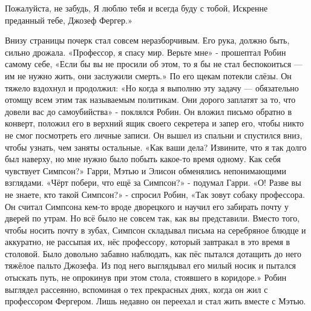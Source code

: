 \documentclass[a4paper,12pt]{book}
\begin{document}
	Пожалуйста, не забудь,
	Я люблю тебя и всегда буду с тобой,
	Искренне преданный тебе,
	Джозеф Фергер.»	
	
	Внизу страницы почерк стал совсем неразборчивым. Его рука, должно быть, сильно дрожала.	
	«Профессор, я спасу мир. Верьте мне» - прошептал Робин самому себе,
	«Если бы вы не просили об этом, то я бы не стал беспокоиться — им не нужно жить, они заслужили смерть.»
	По его щекам потекли слёзы. Он тяжело вздохнул и продолжил:
	«Но когда я выполню эту задачу — обязательно отомщу всем этим так называемым политикам. Они дорого заплатят за то, что довели вас до самоубийства» - поклялся Робин.
	Он вложил письмо обратно в конверт, положил его в верхний ящик своего секретера и запер его, чтобы никто не смог посмотреть его личные записи.
	Он вышел из спальни и спустился вниз, чтобы узнать, чем заняты остальные.
	«Как ваши дела? Извините, что я так долго был наверху, но мне нужно было побыть какое-то время одному. Как себя чувствует Симпсон?»
	Гарри, Мэтью и Элисон обменялись непонимающими взглядами.
	«Чёрт побери, что ещё за Симпсон?» - подумал Гарри.
	«О! Разве вы не знаете, кто такой Симпсон?» - спросил Робин,
	«Так зовут собаку профессора. Он считал Симпсона кем-то вроде дворецкого и научил его забирать почту у дверей по утрам. Но всё было не совсем так, как вы представили. Вместо того, чтобы носить почту в зубах, Симпсон складывал письма на серебряное блюдце и аккуратно, не рассыпая их, нёс профессору, который завтракал в это время в столовой. Было довольно забавно наблюдать, как пёс пытался дотащить до него тяжёлое пальто Джозефа. Из под него выглядывал его милый носик и пытался отыскать путь, не опрокинув при этом стола, стоявшего в коридоре.»
	Робин выглядел рассеянно, вспоминая о тех прекрасных днях, когда он жил с профессором Фергером. Лишь недавно он переехал и стал жить вместе с Мэтью.
\end{document}
